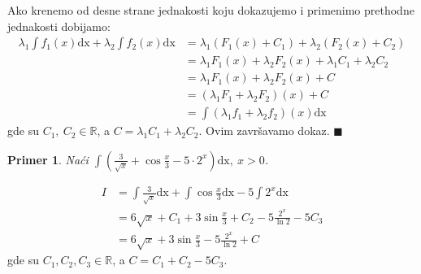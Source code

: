 \documentclass{article}
\newtheorem{prim}{Primer}[section]
\begin{document}
Ako krenemo od desne strane jednakosti koju dokazujemo i
primenimo prethodne jednakosti dobijamo:
\begin{align*}
    \lambda_1\int f_1(x) \text{dx} + \lambda_2\int f_2(x) \text{dx} & =\lambda_1(F_1(x) + C_1) + \lambda_2(F_2(x) + C_2)                       \\
                                                                    & =\lambda_1  F_1(x) + \lambda_2  F_2(x) + \lambda_1  C_1 + \lambda_2  C_2 \\
                                                                    & =\lambda_1  F_1(x) + \lambda_2  F_2(x) + C                               \\
                                                                    & =(\lambda_1 F_1 + \lambda_2 F_2)(x) + C                                  \\
                                                                    & =\int (\lambda_1 f_1+ \lambda_2 f_2)(x)\text{dx}
\end{align*}
gde su $C_1,\ C_2\in\mathbb{R}$, a $C=\lambda_1C_1+\lambda_2C_2$. Ovim završavamo dokaz.
\null\hfill $\blacksquare$\par
\begin{primbox}
    \begin{prim}
        Naći $\int (\frac{3}{\sqrt{x}} +
            \cos\frac{x}{3} - 5\cdot 2^x)\text{dx},\ x > 0$.
    \end{prim}
    \begin{align*}
        I & = \int\frac{3}{\sqrt{x}} \text{dx} + \int \cos\frac{x}{3} \text{dx} - 5\int 2^x \text{dx}
        \\ & = 6\sqrt{x} + C_1 + 3\sin\frac{x}{3} + C_2 - 5\frac{2^x}{\ln{2}} - 5C_3
        \\ & = 6\sqrt{x} + 3\sin\frac{x}{3} - 5\frac{2^x}{\ln{2}} + C
    \end{align*}
    gde su $C_1,C_2,C_3\in\mathbb{R}$, a $C=C_1+C_2-5C_3$.
\end{primbox}
\end{document}
